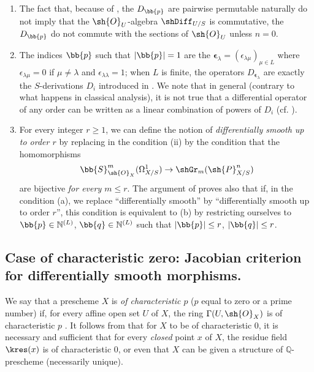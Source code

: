 \begin{remarks}[16.11.3]
\label{IV.16.11.3}
\begin{enumerate}
  \item[\rm{(i)}] The fact that, because of , the $D_\bb{p}$ are pairwise permutable naturally do not imply that the $\sh{O}_U$-algebra $\shDiff_{U/S}$ is commutative, the $D_\bb{p}$ do not commute with the sections of $\sh{O}_U$ unless $n = 0$.
  \item[\rm{(ii)}] The indices $\bb{p}$ such that $|\bb{p}| = 1$ are the $\pmb{\epsilon}_\lambda =  (\epsilon_{\lambda\mu})_{\mu \in L}$ where $\epsilon_{\lambda\mu} = 0$ if $\mu \neq \lambda$ and $\epsilon_{\lambda\lambda} = 1$;
  when $L$ is finite, the operators $D_{\pmb{\epsilon}_\lambda}$ are exactly the $S$-derivations $D_i$ introduced in .
  We note that in general (contrary to what happens in classical analysis), it is not true that a differential operator of any order can be written as a linear combination of powers of $D_i$ (cf. ). 
  \item[\rm{(iii)}] For every integer $r \geq 1$, we can define the notion of \emph{differentially smooth up to order $r$} by replacing in  the condition (ii) by the condition that the homomorphisms
  \[
    \bb{S}_{\sh{O}_X}^m(\Omega_{X/S}^1) \to \shGr_m(\sh{P}_{X/S}^n)
  \]
  are bijective \emph{for every $m \leq r$}.
  The argument of  proves also that if, in the condition (a), we replace ``differentially smooth'' by ``differentially smooth up to order $r$'', this condition is equivalent to (b) by restricting ourselves to $\bb{p} \in \mathbb{N}^{(L)}$, $\bb{q} \in \mathbb{N}^{(L)}$  such that $|\bb{p}| \leq r$, $|\bb{q}| \leq r$.
\end{enumerate}
\end{remarks}

\subsection{Case of characteristic zero: Jacobian criterion for differentially smooth morphisms.}
\label{IV.16.12}

\begin{env}[16.12.1]
\label{IV.16.12.1}
We say that a prescheme $X$ is \emph{of characteristic $p$} ($p$ equal to zero or a prime number) if, for every affine open set $U$ of $X$, the ring $\Gamma(U, \sh{O}_X)$ is of characteristic $p$ .
It follows from  that for $X$ to be of characteristic $0$, it is necessary and sufficient that for every \emph{closed} point $x$ of $X$, the residue field $\kres(x)$ is of characteristic $0$, or even that $X$ can be given a structure of $\mathbb{Q}$-prescheme (necessarily unique).
\end{env}

